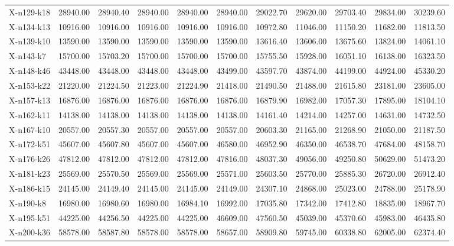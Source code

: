 \documentclass[letterpaper]{article} %
\begin{document}
\begin{landscape}
\begin{longtable}{@{}l rr rr rr rr rr@{}}
X-n129-k18 & 28940.00 & 28940.40 & 28940.00 & 28940.00 & 28940.00 & 29022.70 & 29620.00 & 29703.40 & 29834.00 & 30239.60 \\
X-n134-k13 & 10916.00 & 10916.00 & 10916.00 & 10916.00 & 10916.00 & 10972.80 & 11046.00 & 11150.20 & 11682.00 & 11813.50 \\
X-n139-k10 & 13590.00 & 13590.00 & 13590.00 & 13590.00 & 13590.00 & 13616.40 & 13606.00 & 13675.60 & 13824.00 & 14061.10 \\
X-n143-k7 & 15700.00 & 15703.20 & 15700.00 & 15700.00 & 15700.00 & 15755.50 & 15928.00 & 16051.10 & 16138.00 & 16323.50 \\
X-n148-k46 & 43448.00 & 43448.00 & 43448.00 & 43448.00 & 43499.00 & 43597.70 & 43874.00 & 44199.00 & 44924.00 & 45330.20 \\
X-n153-k22 & 21220.00 & 21224.50 & 21223.00 & 21224.90 & 21418.00 & 21490.50 & 21488.00 & 21615.80 & 23181.00 & 23605.00 \\
X-n157-k13 & 16876.00 & 16876.00 & 16876.00 & 16876.00 & 16876.00 & 16879.90 & 16982.00 & 17057.30 & 17895.00 & 18104.10 \\
X-n162-k11 & 14138.00 & 14138.00 & 14138.00 & 14138.00 & 14138.00 & 14161.40 & 14214.00 & 14257.00 & 14631.00 & 14732.50 \\
X-n167-k10 & 20557.00 & 20557.30 & 20557.00 & 20557.00 & 20557.00 & 20603.30 & 21165.00 & 21268.90 & 21050.00 & 21187.50 \\
X-n172-k51 & 45607.00 & 45607.80 & 45607.00 & 45607.00 & 46580.00 & 46952.90 & 46350.00 & 46538.70 & 47684.00 & 48158.70 \\
X-n176-k26 & 47812.00 & 47812.00 & 47812.00 & 47812.00 & 47816.00 & 48037.30 & 49056.00 & 49250.80 & 50629.00 & 51473.20 \\
X-n181-k23 & 25569.00 & 25570.50 & 25569.00 & 25569.00 & 25571.00 & 25603.50 & 25770.00 & 25885.30 & 26720.00 & 26912.40 \\
X-n186-k15 & 24145.00 & 24149.40 & 24145.00 & 24145.00 & 24149.00 & 24307.10 & 24868.00 & 25023.00 & 24788.00 & 25178.90 \\
X-n190-k8 & 16980.00 & 16980.60 & 16980.00 & 16984.10 & 16992.00 & 17035.80 & 17342.00 & 17412.80 & 18835.00 & 18967.70 \\
X-n195-k51 & 44225.00 & 44256.50 & 44225.00 & 44225.00 & 46609.00 & 47560.50 & 45039.00 & 45370.60 & 45983.00 & 46435.80 \\
X-n200-k36 & 58578.00 & 58587.80 & 58578.00 & 58578.00 & 58657.00 & 58909.80 & 59745.00 & 60338.80 & 62005.00 & 62374.40 \\

\end{longtable}
\end{landscape}
\end{document}
